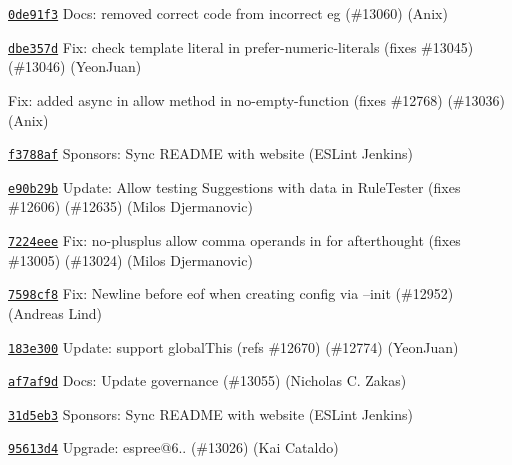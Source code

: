 \begin{DoxyItemize}
\item \href{https://github.com/eslint/eslint/commit/0de91f39a97cdf530cb64edbadde57a2bb41ca86}{\texttt{ {\ttfamily 0de91f3}}} Docs\+: removed correct code from incorrect eg (\#13060) (Anix)
\item \href{https://github.com/eslint/eslint/commit/dbe357de199620675446464f6fd0e35064c4d247}{\texttt{ {\ttfamily dbe357d}}} Fix\+: check template literal in prefer-\/numeric-\/literals (fixes \#13045) (\#13046) (Yeon\+Juan)
\item \href{https://github.com/eslint/eslint/commit/2260611e616bdc2a0bf16d508b60a50772ce7fbb}{\texttt{ {}}} Fix\+: added async in allow method in no-\/empty-\/function (fixes \#12768) (\#13036) (Anix)
\item \href{https://github.com/eslint/eslint/commit/f3788aff615edfbfb7afc4c491bb07d20737531b}{\texttt{ {\ttfamily f3788af}}} Sponsors\+: Sync README with website (ESLint Jenkins)
\item \href{https://github.com/eslint/eslint/commit/e90b29bb1f41d4e5767e33d03db5984f036586ed}{\texttt{ {\ttfamily e90b29b}}} Update\+: Allow testing Suggestions with data in Rule\+Tester (fixes \#12606) (\#12635) (Milos Djermanovic)
\item \href{https://github.com/eslint/eslint/commit/7224eee3ff4b4378d3439deb038bf34b116fa48b}{\texttt{ {\ttfamily 7224eee}}} Fix\+: no-\/plusplus allow comma operands in for afterthought (fixes \#13005) (\#13024) (Milos Djermanovic)
\item \href{https://github.com/eslint/eslint/commit/7598cf816bd854de1dd7d96cf00dec6ecc4564ac}{\texttt{ {\ttfamily 7598cf8}}} Fix\+: Newline before eof when creating config via --init (\#12952) (Andreas Lind)
\item \href{https://github.com/eslint/eslint/commit/183e3006841c29efdd245c45a72e6cefac86ae35}{\texttt{ {\ttfamily 183e300}}} Update\+: support global\+This (refs \#12670) (\#12774) (Yeon\+Juan)
\item \href{https://github.com/eslint/eslint/commit/af7af9d32ea8073d2d0d726cc8551351261a170f}{\texttt{ {\ttfamily af7af9d}}} Docs\+: Update governance (\#13055) (Nicholas C. Zakas)
\item \href{https://github.com/eslint/eslint/commit/31d5eb3e60b6c2ee26976721f07cc89d60867659}{\texttt{ {\ttfamily 31d5eb3}}} Sponsors\+: Sync README with website (ESLint Jenkins)
\item \href{https://github.com/eslint/eslint/commit/95613d46b7900b3d9757a7f6959d5dfb262f29fc}{\texttt{ {\ttfamily 95613d4}}} Upgrade\+: espree@6.. (\#13026) (Kai Cataldo)

\end{DoxyItemize}

